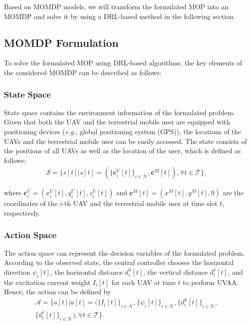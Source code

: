 \documentclass[10pt,journal,compsoc]{IEEEtran}
\begin{document}
\par Based on MOMDP models, we will transform the formulated MOP into an MOMDP and solve it by using a DRL-based method in the following section.

\subsection{MOMDP Formulation}

\par To solve the formulated MOP using DRL-based algorithms, the key elements of the considered MOMDP can be described as follows:

\subsubsection{State Space}

\par State space contains the environment information of the formulated problem. Given that both the UAV and the terrestrial mobile user are equipped with positioning devices (\textit{e.g.}, global positioning system (GPS)), the locations of the UAVs and the terrestrial mobile user can be easily accessed. The state consists of the positions of all UAVs as well as the location of the user, which is defined as follows:
\begin{equation}
\begin{aligned}
    \mathcal{S} =  \{s[t] | s[t] = \left ( \{\mathbf{c}^U_i[t]\}_{i \in \mathcal{N}}, \mathbf{c}^M[t]\right), \forall t \in \mathcal{T}  \},
\end{aligned}
\end{equation}
    
\noindent where $\mathbf{c}^U_i = (x^U_i[t], y^U_i[t], z^U_i[t])$ and $\mathbf{c}^M[t] = (x^M[t], y^M[t], 0)$ are the coordinates of the $i$-th UAV and the terrestrial mobile user at time slot $t$, respectively.
    
\subsubsection{Action Space}

\par The action space can represent the decision variables of the formulated problem. According to the observed state, the central controller chooses the horizontal direction $\psi_i[t]$, the horizontal distance $d^h_i[t]$, the vertical distance $d^v_i[t]$, and the excitation current weight $I_i[t]$ for each UAV at time $t$ to perform UVAA. Hence, the action can be defined by
\begin{equation}
\begin{aligned}
    \mathcal{A} = \{ a[t] | a[t] = \big( \{I_i[t]\}_{i \in \mathcal{N}}, \{\psi_i[t]\}_{i \in \mathcal{N}}, \{d^h_i[t]\}_{i \in \mathcal{N}}, \\ \{d^v_i[t]\}_{i \in \mathcal{N}} \big), \forall t \in \mathcal{T} \}.
\end{aligned}
\end{equation}
\end{document}

